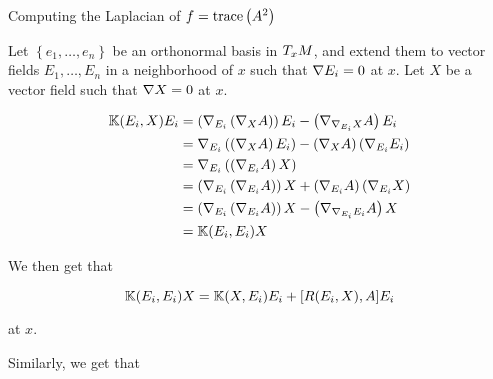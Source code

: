\begin{frame}[allowframebreaks]{Computing the Laplacian of \(f=\trace{A^{2}}\)}
  \framebreak

  Let \(\left\{e_{1},\ldots,e_{n}\right\}\) be an orthonormal basis in
  \(\tangentspace{M}{x}\), and extend them to vector fields
  \(E_{1},\ldots,E_{n}\) in a neighborhood of \(x\) such that
  \(\immersionconn{E_{i}}=0\) at \(x\). Let \(X\) be a vector field such that
  \(\immersionconn{X}=0\) at \(x\).

  \framebreak

  \begin{align*}
    \ShapeOperatorsSecondCovariantDerivative(E_{i},X)E_{i} & =\left(\immersionconn_{E_{i}}\left(\immersionconn_{X}A\right)\right)E_{i}-\left(\immersionconn_{\immersionconn_{E_{i}}X}A\right)E_{i}              \\
                                                           & =\immersionconn_{E_{i}}\left(\left(\immersionconn_{X}A\right)E_{i}\right)-\left(\immersionconn_{X}A\right)\left(\immersionconn_{E_{i}}E_{i}\right) \\
                                                           & =\immersionconn_{E_{i}}\left(\left(\immersionconn_{E_{i}}A\right)X\right)                                                                          \\
                                                           & =\left(\immersionconn_{E_{i}}\left(\immersionconn_{E_{i}}A\right)\right)X+\left(\immersionconn_{E_{i}}A\right)\left(\immersionconn_{E_{i}}X\right) \\
                                                           & =\left(\immersionconn_{E_{i}}\left(\immersionconn_{E_{i}}A\right)\right)X-\left(\immersionconn_{\immersionconn_{E_{i}}E_{i}}A\right)X              \\
                                                           & =\ShapeOperatorsSecondCovariantDerivative(E_{i},E_{i})X
  \end{align*}

  \framebreak

  We then get that

  \begin{equation}\label{eq:shape-operators-second-convariant-derivative-at-ei-ei}
    \ShapeOperatorsSecondCovariantDerivative(E_{i},E_{i})X=\ShapeOperatorsSecondCovariantDerivative(X,E_{i})E_{i}+[R(E_{i},X),A]E_{i}
  \end{equation}

  at \(x\).

  \framebreak

  Similarly, we get that


\end{frame}
